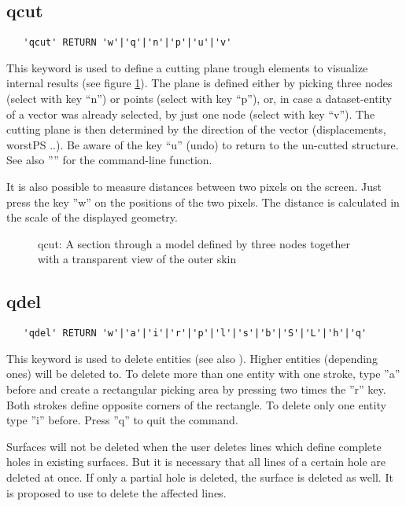 \documentclass{article}
\begin{document}
\subsection{\label{qcut}qcut}
\begin{verbatim}
   'qcut' RETURN 'w'|'q'|'n'|'p'|'u'|'v'
\end{verbatim}
This keyword is used to define a cutting plane trough elements to visualize internal results (see figure \ref{qcutp}). The plane is defined either by picking three nodes (select with key ``n'') or points (select with key ``p''), or, in case a dataset-entity of a vector was already selected, by just one node (select with key ``v''). The cutting plane is then determined by the direction of the vector (displacements, worstPS ..). Be aware of the key ``u'' (undo) to return to the un-cutted structure. See also '''' for the command-line function.
 
It is also possible to measure distances between two pixels on the screen. Just press the key ''w'' on the positions of the two pixels. The distance is calculated in the scale of the displayed geometry.
  
\begin{figure}[h]
\caption{\label{qcutp}qcut: A section through a model defined by three nodes together with a transparent view of the outer skin}
\end{figure}

\subsection{\label{qdel}qdel}
\begin{verbatim}
   'qdel' RETURN 'w'|'a'|'i'|'r'|'p'|'l'|'s'|'b'|'S'|'L'|'h'|'q' 
\end{verbatim}
This keyword is used to delete entities (see also ). Higher entities (depending ones) will be deleted to. To delete more than one entity with one stroke, type ''a'' before and create a rectangular picking area by pressing two times the ''r'' key. Both strokes define opposite corners of the rectangle. To delete only one entity type ''i'' before. Press ''q'' to quit the command.

Surfaces will not be deleted when the user deletes lines which define complete holes in existing surfaces. But it is necessary that all lines of a certain hole are deleted at once. If only a partial hole is deleted, the surface is deleted as well. It is proposed to use  to delete the affected lines. 
\end{document}
